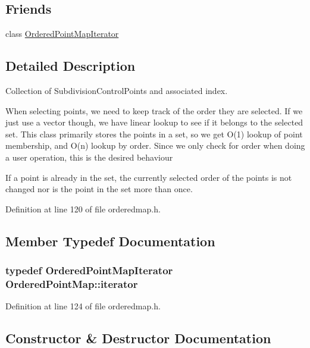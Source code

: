 \subsection*{Friends}
\begin{DoxyCompactItemize}
\item 
class \hyperlink{classOrderedPointMap_a7bb53502d3b4a6a62a846b20b2192e6b}{Ordered\+Point\+Map\+Iterator}
\end{DoxyCompactItemize}


\subsection{Detailed Description}
Collection of Subdivision\+Control\+Points and associated index. 

When selecting points, we need to keep track of the order they are selected. If we just use a vector though, we have linear lookup to see if it belongs to the selected set. This class primarily stores the points in a set, so we get O(1) lookup of point membership, and O(n) lookup by order. Since we only check for order when doing a user operation, this is the desired behaviour

If a point is already in the set, the currently selected order of the points is not changed nor is the point in the set more than once. 

Definition at line 120 of file orderedmap.\+h.



\subsection{Member Typedef Documentation}
\subsubsection[{\texorpdfstring{iterator}{iterator}}]{\setlength{\rightskip}{0pt plus 5cm}typedef {\bf Ordered\+Point\+Map\+Iterator} {\bf Ordered\+Point\+Map\+::iterator}}\hypertarget{classOrderedPointMap_ae58ae7176ea9345af14a8f53bbe57d69}{}\label{classOrderedPointMap_ae58ae7176ea9345af14a8f53bbe57d69}


Definition at line 124 of file orderedmap.\+h.



\subsection{Constructor \& Destructor Documentation}

